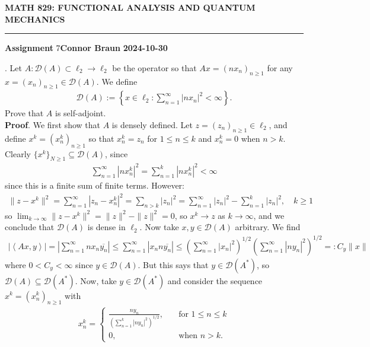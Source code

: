 \documentclass[10pt]{article}
\newcommand{\1}[1]{\mathbbm{1}_{#1}} \newcommand{\mc}[1]{\mathcal{#1}}
\newcommand{\ip}[2]{\left\langle#1,#2\right\rangle }
\begin{document}
    \begin{center}
        {\bf\large{MATH 829: FUNCTIONAL ANALYSIS AND QUANTUM MECHANICS}}
        \smallskip
        \hrule
        \smallskip
        {\bf Assignment} 7\hfill {\bf Connor Braun} \hfill {\bf 2024-10-30}
    \end{center}
    . Let $A:\mc{D}(A)\subset \ell_2\rightarrow \ell_2$ be the operator so that $Ax=(nx_n)_{n\geq 1}$ for any $x=(x_n)_{n\geq 1}\in\mc{D}(A)$. We define
    \begin{align*}
        \mc{D}(A):=\left\{x\in\ell_2:\sum_{n=1}^\infty|nx_n|^2<\infty\right\}.
    \end{align*} 
    Prove that $A$ is self-adjoint.\\[5pt]
    {\bf Proof}. We first show that $A$ is densely defined. Let $z=(z_n)_{n\geq 1}\in\ell_2$, and define $x^k=(x^k_n)_{n\geq 1}$ so that $x_n^k=z_n$ for $1\leq n\leq k$ and $x^k_n=0$ when $n>k$. Clearly $\{x^k\}_{N\geq 1}\subseteq\mc{D}(A)$, since
    \begin{align*}
        \sum_{n=1}^\infty|nx^k_n|^2=\sum_{n=1}^k|nx^k_n|^2<\infty
    \end{align*}
    since this is a finite sum of finite terms. However:
    \begin{align*}
        \|z-x^k\|^2=\sum_{n=1}^\infty|z_n-x^k_n|^2=\sum_{n>k}|z_n|^2=\sum_{n=1}^\infty|z_n|^2-\sum_{n=1}^k|z_n|^2,\quad k\geq 1
    \end{align*}
    so $\lim_{k\rightarrow\infty}\|z-x^k\|^2=\|z\|^2-\|z\|^2=0$, so $x^k\rightarrow z$ as $k\rightarrow\infty$, and we conclude that $\mc{D}(A)$ is dense in $\ell_2$.
    Now take $x,y\in\mc{D}(A)$ arbitrary. We find
    \begin{align*}
        |\ip{Ax}{y}|=\left|\sum_{n=1}^\infty nx_n\overline{y_n}\right|\leq\sum_{n=1}^\infty |x_n n\overline{y_n}|\leq\left(\sum_{n=1}^\infty|x_n|^2\right)^{1/2}\left(\sum_{n=1}^\infty|ny_n|^2\right)^{1/2}=:C_y\|x\|
    \end{align*}
    where $0<C_y<\infty$ since $y\in\mc{D}(A)$. But this says that $y\in\mc{D}(A^\ast)$, so $\mc{D}(A)\subseteq\mc{D}(A^\ast)$. Now, take $y\in\mc{D}(A^\ast)$ and consider the sequence $x^k=(x^k_n)_{n\geq 1}$ with
    \begin{align*}
        x^k_n=\begin{cases}
            \frac{ny_n}{\left(\sum_{n=1}^k|ny_n|^2\right)^{1/2}},\quad&\text{for $1\leq n\leq k$}\\
            0,\quad&\text{when $n>k$.}
        \end{cases}
    \end{align*}
\end{document}
